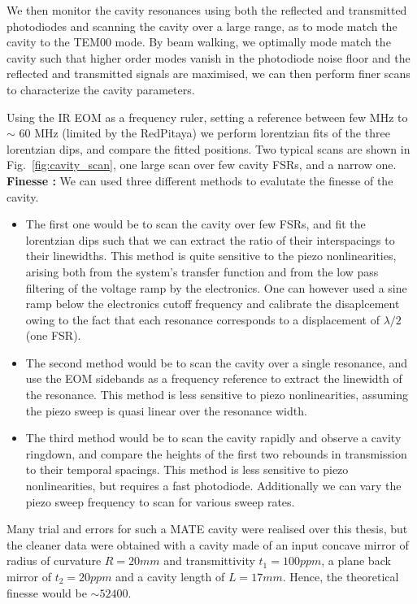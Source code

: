 We then monitor the cavity resonances using both the reflected and transmitted photodiodes and scanning the cavity over a large range, as to mode match the cavity to the TEM00 mode. By beam walking, we optimally mode match the cavity such that higher order modes vanish in the photodiode noise floor and the reflected and transmitted signals are maximised, we can then perform finer scans to characterize the cavity parameters.

Using the IR EOM as a frequency ruler, setting a reference between few MHz to $\sim$ 60 MHz (limited by the RedPitaya) we perform lorentzian fits of the three lorentzian dips, and compare the fitted positions. Two typical scans are shown in Fig.~\ref{fig:cavity_scan}, one large scan over few cavity FSRs, and a narrow one. \\ 

\noindent  \textbf{Finesse :} We can used three different methods to evalutate the finesse of the cavity. 
\begin{itemize}
  \item The first one would be to scan the cavity over few FSRs, and fit the lorentzian dips such that we can extract the ratio of their interspacings to their linewidths. This method is quite sensitive to the piezo nonlinearities, arising both from the system's transfer function and from the low pass filtering of the voltage ramp by the electronics. One can however used a sine ramp below the electronics cutoff frequency and calibrate the disaplcement owing to the fact that each resonance corresponds to a displacement of $\lambda/2$ (one FSR). 
  \item The second method would be to scan the cavity over a single resonance, and use the EOM sidebands as a frequency reference to extract the linewidth of the resonance. This method is less sensitive to piezo nonlinearities, assuming the piezo sweep is quasi linear over the resonance width. 
  \item The third method would be to scan the cavity rapidly and observe a cavity ringdown, and compare the heights of the first two rebounds in transmission to their temporal spacings. This method is less sensitive to piezo nonlinearities, but requires a fast photodiode. Additionally we can vary the piezo sweep frequency to scan for various sweep rates. 
\end{itemize}

Many trial and errors for such a MATE cavity were realised over this thesis, but the cleaner data were obtained with a cavity made of an input concave mirror of radius of curvature $R=20mm$ and transmittivity $t_1=100ppm$, a plane back mirror of $t_2=20ppm$ and a cavity length of $L=17mm$. Hence, the theoretical finesse would be $\sim 52400$. \\ 

